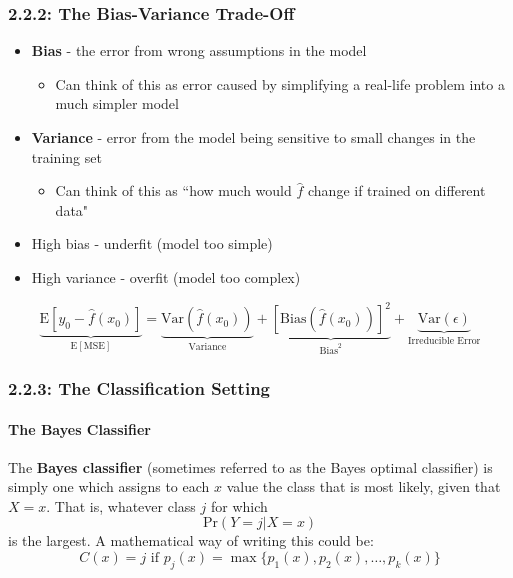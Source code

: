 \subsubsection*{2.2.2: The  Bias-Variance Trade-Off}
\begin{itemize}
\item  \textbf{Bias} - the error from wrong assumptions in the model

  \begin{itemize}
  \tightlist
  \item  Can think of this as error caused by simplifying a real-life problem  into a much simpler model
  \end{itemize}
\item  \textbf{Variance} - error from the model being sensitive to small changes in the training set

  \begin{itemize}
  \tightlist
  \item    Can think of this as ``how much would \(\hat f\) change if trained  on different data"
  \end{itemize}
\item  High bias - underfit (model too simple)
\item  High variance - overfit (model too complex)
\end{itemize}

\begin{equation*}\tag{2.7}
\underbrace{\text{E}[y_0 - \hat{f}(x_0)]}_{\text{E}[\text{MSE}]}=\underbrace{\text{Var}(\hat f(x_0))}_{\text{Variance}}+ \underbrace{[\text{Bias}(\hat f(x_0))]^2}_{\text{Bias}^2} + \underbrace{\text{Var}(\epsilon)}_{\text{Irreducible Error}}
\end{equation*}

\subsubsection*{2.2.3: The Classification Setting}\label{the-classification-setting}

\paragraph{The Bayes Classifier\\}


The \textbf{Bayes classifier} (sometimes referred to as the Bayes optimal classifier) is simply one which assigns to each \(x\) value the class that is most likely, given that \(X=x\). That is, whatever class \(j\) for which 
\begin{equation*} \tag{2.10}
\text{Pr}(Y=j | X=x)
\end{equation*}
is the largest. A mathematical way of writing this
could be: 
\begin{equation*} \tag{Not in book}
C(x) = j \text{ if } p_j(x) = \max\{p_1(x), p_2(x), \ldots, p_k(x)\}
\end{equation*}

